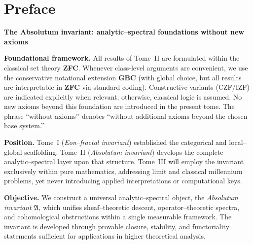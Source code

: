 
\chapter*{Preface}

\begin{center}
\textbf{The Absolutum invariant: analytic–spectral foundations without new axioms}
\end{center}

\vspace{0.75em}

\noindent\textbf{Foundational framework.}
All results of Tome~II are formulated within the classical set theory \textbf{ZFC}.
Whenever class-level arguments are convenient, we use the conservative notational extension \textbf{GBC} 
(with global choice, but all results are interpretable in \textbf{ZFC} via standard coding).  
Constructive variants (CZF/IZF) are indicated explicitly when relevant; otherwise, classical logic is assumed.  
No new axioms beyond this foundation are introduced in the present tome.  
The phrase “without axioms’’ denotes “without additional axioms beyond the chosen base system.’’

\vspace{0.5em}
\noindent\textbf{Position.}
Tome~I (\emph{Eon–fractal invariant}) established the categorical and local–global scaffolding.
Tome~II (\emph{Absolutum invariant}) develops the complete analytic–spectral layer upon that structure.
Tome~III will employ the invariant exclusively within pure mathematics, addressing limit and classical millennium problems, yet never introducing applied interpretations or computational keys.

\vspace{0.5em}
\noindent\textbf{Objective.}
We construct a universal analytic–spectral object, the \emph{Absolutum invariant} \(\mathfrak A\),
which unifies sheaf–theoretic descent, operator–theoretic spectra, and cohomological obstructions within a single measurable framework.
The invariant is developed through provable closure, stability, and functoriality statements sufficient for applications in higher theoretical analysis.


